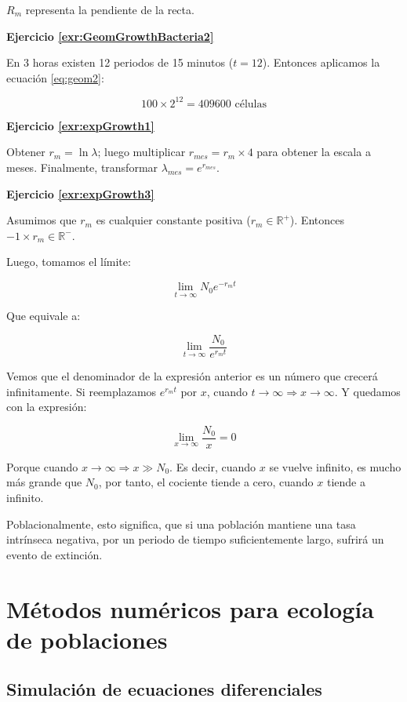 \documentclass[12pt,letterpaper,]{book}
\begin{document}
\(R_m\) representa la pendiente de la recta.

\textbf{Ejercicio \ref{exr:GeomGrowthBacteria2}}

En 3 horas existen 12 periodos de 15 minutos (\(t=12\)). Entonces
aplicamos la ecuación \eqref{eq:geom2}:

\[
100\times 2^{12} = \num{409600}\text{ células}
\]

\textbf{Ejercicio \ref{exr:expGrowth1}}

Obtener \(r_m = \ln \lambda\); luego multiplicar
\(r_{mes}=r_m \times 4\) para obtener la escala a meses. Finalmente,
transformar \(\lambda_{mes}=e^{r_{mes}}\).

\textbf{Ejercicio \ref{exr:expGrowth3}}

Asumimos que \(r_m\) es cualquier constante positiva
(\(r_m \in \mathbb{R}^+\)). Entonces \(-1\times r_m \in \mathbb{R}^-\).

Luego, tomamos el límite:

\[
\lim_{t \to \infty}N_0 e^{-r_m t}
\]

Que equivale a:

\[
\lim_{t \to \infty}\frac{N_0}{e^{r_m t}}
\]

Vemos que el denominador de la expresión anterior es un número que
crecerá infinitamente. Si reemplazamos \(e^{r_m t}\) por \(x\), cuando
\(t \to \infty \Rightarrow x \to \infty\). Y quedamos con la expresión:

\[
\lim_{x \to \infty}\frac{N_0}{x} = 0
\]

Porque cuando \(x \to \infty \Rightarrow x \gg N_0\). Es decir, cuando
\(x\) se vuelve infinito, es mucho más grande que \(N_0\), por tanto, el
cociente tiende a cero, cuando \(x\) tiende a infinito.

Poblacionalmente, esto significa, que si una población mantiene una tasa
intrínseca negativa, por un periodo de tiempo suficientemente largo,
sufrirá un evento de extinción.

\begingroup
\small
\printindex
\vfill
\endgroup

\appendix


\chapter{Métodos numéricos para ecología de
poblaciones}\label{metodos-numericos-para-ecologia-de-poblaciones}

\section{Simulación de ecuaciones
diferenciales}\label{simulacion-de-ecuaciones-diferenciales}
\end{document}

